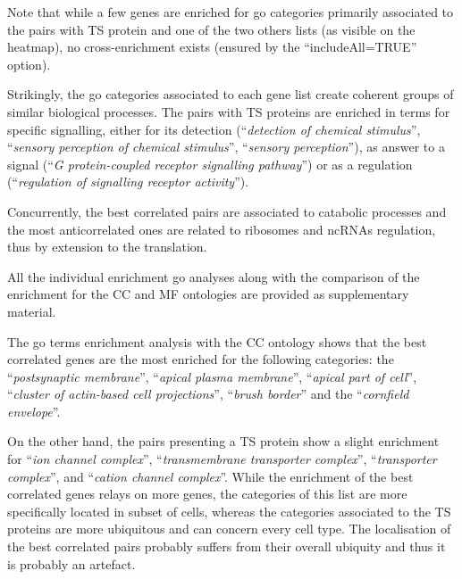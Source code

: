 Note that while a few genes are enriched for \gls{go} categories primarily
associated to the pairs with \gls{TS} protein and one of the two others lists
(as visible on the heatmap),
no cross-enrichment exists
(ensured by the \enquote{\textsf{includeAll=TRUE}} option).\\
\vspace{-\baselineskip}

Strikingly, the \gls{go} categories associated to each gene list create
coherent groups of similar biological processes.
The pairs with \gls{TS} proteins are enriched in terms for specific signalling,
either for its detection (\enquote{\textit{detection of chemical stimulus}},
\enquote{\textit{sensory perception of chemical stimulus}},
\enquote{\textit{sensory perception}}),
as answer to a signal (\enquote{\textit{G protein-coupled receptor signalling pathway}})
or as a regulation (\enquote{\textit{regulation of signalling receptor activity}}).

Concurrently, the best correlated pairs are associated to catabolic processes
and the most anticorrelated ones are related to
ribosomes and \glspl{ncRNA} regulation,
thus by extension to the translation.

All the individual enrichment \gls{go} analyses
along with the comparison of the enrichment for the CC and MF ontologies
are provided as supplementary material.

The \gls{go} terms enrichment analysis with the CC ontology shows
that the best correlated genes are the most enriched
for the following categories:
the \enquote{\textit{postsynaptic membrane}},
\enquote{\textit{apical plasma membrane}},
\enquote{\textit{apical part of cell}},
\enquote{\textit{cluster of actin-based cell projections}},
\enquote{\textit{brush border}}
and the \enquote{\textit{cornfield envelope}}.\mybr\

On the other hand, the pairs presenting a \gls{TS} protein
show a slight enrichment for
\enquote{\textit{ion channel complex}},
\enquote{\textit{transmembrane transporter complex}},
\enquote{\textit{transporter complex}},
and \enquote{\textit{cation channel complex}}.
While the enrichment of the best correlated genes relays on more genes,
the categories of this list are more specifically located in subset of cells,
whereas the categories associated to the \gls{TS} proteins
are more ubiquitous and can concern every cell type.
The localisation of the best correlated pairs probably suffers
from their overall ubiquity
and thus it is probably an artefact.

